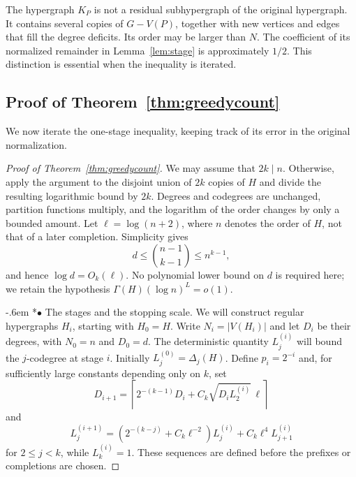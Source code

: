 \documentclass[11pt,reqno]{amsart}
\makeatletter
\numberwithin{equation}{section}
\renewcommand{\paragraph}{\@startsection{paragraph}{4}%
    \z@{.75\linespacing\@plus.2\linespacing\@minus.1\linespacing}%
    {-.6em}%
    {\normalfont\bfseries}}
\newcommand{\proofparagraph}[1]{%
    \paragraph*{$\bullet$ #1}\ignorespaces}
\theoremstyle{plain}
\theoremstyle{definition}
\makeatother
\begin{document}
The hypergraph $K_P$ is not a residual subhypergraph of the original hypergraph.
It contains several copies of $G-V(P)$, together with new vertices and edges that fill the degree deficits.
Its order may be larger than $N$.
The coefficient of its normalized remainder in Lemma~\ref{lem:stage} is approximately $1/2$.
This distinction is essential when the inequality is iterated.

\subsection{Proof of Theorem~\ref{thm:greedycount}}\label{subsec:proof-greedycount}
We now iterate the one-stage inequality, keeping track of its error in the original normalization.

\begin{proof}[Proof of Theorem~\ref{thm:greedycount}]
    We may assume that $2k\mid n$.
    Otherwise, apply the argument to the disjoint union of $2k$ copies of $H$ and divide the resulting logarithmic bound by $2k$.
    Degrees and codegrees are unchanged, partition functions multiply, and the logarithm of the order changes by only a bounded amount.
    Let $\ell=\log(n+2)$, where $n$ denotes the order of $H$, not that of a later completion.
    Simplicity gives
    \[
        d\le\binom{n-1}{k-1}\le n^{k-1},
    \]
    and hence $\log d=O_k(\ell)$.
    No polynomial lower bound on $d$ is required here; we retain the hypothesis $\Gamma(H)(\log n)^L=o(1)$.

    \proofparagraph{The stages and the stopping scale.}
    We will construct regular hypergraphs $H_i$, starting with $H_0=H$.
    Write $N_i=|V(H_i)|$ and let $D_i$ be their degrees, with $N_0=n$ and $D_0=d$.
    The deterministic quantity $L_j^{(i)}$ will bound the $j$-codegree at stage $i$.
    Initially $L_j^{(0)}=\Delta_j(H)$.
    Define $p_i=2^{-i}$ and, for sufficiently large constants depending only on $k$, set
    \begin{equation}\label{eq:greedy-degree-recurrence}
        D_{i+1}=\left\lceil 2^{-(k-1)}D_i+C_k\sqrt{D_iL_2^{(i)}}\,\ell\right\rceil
    \end{equation}
    and
    \begin{equation}\label{eq:greedy-codegree-recurrence}
        L_j^{(i+1)}=(2^{-(k-j)}+C_k\ell^{-2})L_j^{(i)}+C_k\ell^4L_{j+1}^{(i)}
    \end{equation}
    for $2\le j<k$, while $L_k^{(i)}=1$.
    These sequences are defined before the prefixes or completions are chosen.


\end{proof}
\end{document}
